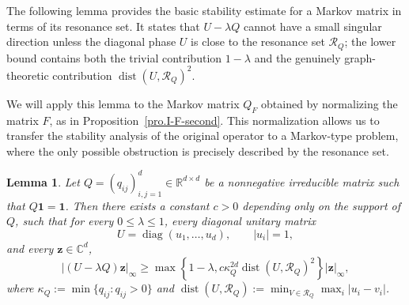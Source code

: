 \documentclass[11pt,twoside, a4paper]{article}
\numberwithin{equation}{section}
\numberwithin{figure}{section}
\theoremstyle{plain} %
\newtheorem{lemma}[theorem]{Lemma}
\theoremstyle{definition}
\theoremstyle{remark}
\newcommand{\1} {\mspace{1 mu}}
\newcommand{\2} {\mspace{2 mu}}
\DeclareMathOperator{\dist}{dist}
\DeclareMathOperator{\diag}{diag}
\begin{document}
\bigskip
The following lemma provides the basic stability estimate for a Markov matrix in terms of its resonance set. 
It states that \(U-\lambda Q\) cannot have a small singular direction unless the diagonal phase \(U\) is close to the resonance set \(\mathscr R_Q\); the lower bound contains both the trivial contribution \(1-\lambda\) and the genuinely graph-theoretic contribution \(\dist(U,\mathscr R_Q)^2\). 

We will apply this lemma to the Markov matrix \(Q_F\) obtained by normalizing the matrix \(F\), as in Proposition~\ref{pro.I-F-second}.
This normalization allows us to transfer the stability analysis of the original operator to a Markov-type problem, where the only possible obstruction is precisely described by the resonance set.


\begin{lemma}\label{lem:UminusQ-graph-resonance}
Let \(Q=(q_{ij})_{i,j=1}^d\in\mathbb R^{d\times d}\) be a nonnegative irreducible matrix such that \(Q\mathbf 1=\mathbf 1\).
Then there exists a constant \(c>0\) depending only on the support of \(Q\), such that for every \(0\le \lambda\le 1\), every diagonal unitary matrix
\[
U=\diag(u_1,\dots,u_d),\qquad |u_i|=1,
\]
and every \(\mathbf z\in\mathbb C^d\),
\begin{equation}\label{eq.bulk-stability-lemma}
  |(U-\lambda Q)\mathbf z|_\infty
\ge\max\left\{1-\lambda,c\kappa_Q^{2d}\dist(U,\mathscr{R}_Q)^2\right\}|\mathbf z|_\infty,
\end{equation}
where
$
\kappa_Q:=\min\{q_{ij}:q_{ij}>0\}
$
and $\dist(U,\mathscr{R}_Q):=\min_{V\in\mathscr{R}_Q}\max_{i}|u_i-v_i|$.
\end{lemma}
\end{document}

